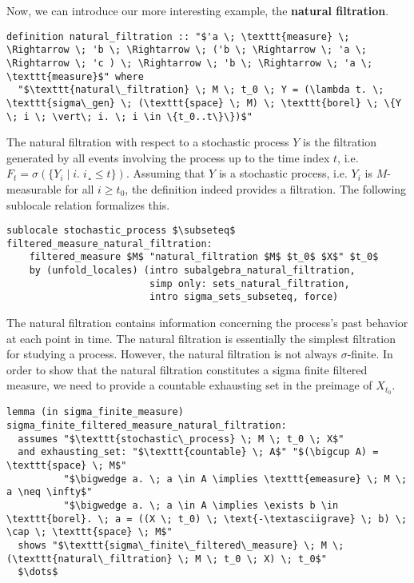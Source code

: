 Now, we can introduce our more interesting example, the \textbf{natural filtration}.

\begin{isadefinition}
{\small
\begin{lstlisting}[style=isabelle]
definition natural_filtration :: "$'a \; \texttt{measure} \; \Rightarrow \; 'b \; \Rightarrow \; ('b \; \Rightarrow \; 'a \; \Rightarrow \; 'c ) \; \Rightarrow \; 'b \; \Rightarrow \; 'a \; \texttt{measure}$" where
  "$\texttt{natural\_filtration} \; M \; t_0 \; Y = (\lambda t. \; \texttt{sigma\_gen} \; (\texttt{space} \; M) \; \texttt{borel} \; \{Y \; i \; \vert\; i. \; i \in \{t_0..t\}\})$"
\end{lstlisting}
}
\end{isadefinition}
The natural filtration with respect to a stochastic process $Y$ is the filtration generated by all events involving the process up to the time index $t$, i.e. $F_t = \sigma(\{Y_i \; \vert\; i. \; i¸ \le t\})$. Assuming that $Y$ is a stochastic process, i.e. $Y_i$ is $M$-measurable for all $i \ge t_0$, the definition indeed provides a filtration. The following sublocale relation formalizes this.

\begin{isalemma}
{\small
\begin{lstlisting}[style=isabelle]
sublocale stochastic_process $\subseteq$ filtered_measure_natural_filtration: 
	filtered_measure $M$ "natural_filtration $M$ $t_0$ $X$" $t_0$
    by (unfold_locales) (intro subalgebra_natural_filtration, 
						 simp only: sets_natural_filtration, 
						 intro sigma_sets_subseteq, force) 
\end{lstlisting}
}
\end{isalemma}

The natural filtration contains information concerning the process's past behavior at each point in time. The natural filtration is essentially the simplest filtration for studying a process. However, the natural filtration is not always $\sigma$-finite. In order to show that the natural filtration constitutes a sigma finite filtered measure, we need to provide a countable exhausting set in the preimage of $X_{t_0}$.

\begin{isalemma}
{\small
\begin{lstlisting}[style=isabelle]
lemma (in sigma_finite_measure) sigma_finite_filtered_measure_natural_filtration:
  assumes "$\texttt{stochastic\_process} \; M \; t_0 \; X$"
  and exhausting_set: "$\texttt{countable} \; A$" "$(\bigcup A) = \texttt{space} \; M$" 
		  "$\bigwedge a. \; a \in A \implies \texttt{emeasure} \; M \; a \neq \infty$" 
		  "$\bigwedge a. \; a \in A \implies \exists b \in \texttt{borel}. \; a = ((X \; t_0) \; \text{-\textasciigrave} \; b) \; \cap \; \texttt{space} \; M$"
  shows "$\texttt{sigma\_finite\_filtered\_measure} \; M \; (\texttt{natural\_filtration} \; M \; t_0 \; X) \; t_0$"
  $\dots$
\end{lstlisting}
}
\end{isalemma}

